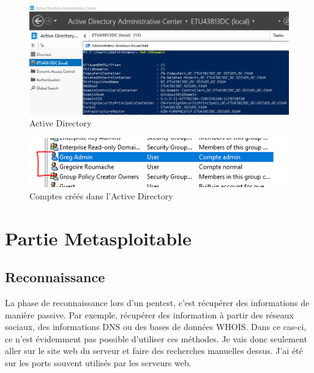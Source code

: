 \documentclass[a4paper]{article}
\begin{document}
\begin{figure}[H]
    \centering
    \includegraphics[width=0.90\linewidth]{images/active-directory.PNG}
    \caption{Active Directory}
    \label{fig:AD}
\end{figure}
\begin{figure}[H]
    \centering
    \includegraphics[width=0.6\linewidth]{images/comptes-active-directory.PNG}
    \caption{Comptes créés dans l'Active Directory}
    \label{fig:comptesAD}
\end{figure}















\newpage \section{Partie Metasploitable}










\subsection{Reconnaissance}





La phase de reconnaissance lors d'un pentest, c'est récupérer des informations de manière passive. Par exemple, récupérer des information à partir des réseaux sociaux, des informations DNS ou des bases de données WHOIS. Dans ce cas-ci, ce n'est évidemment pas possible d'utiliser ces méthodes. Je vais donc seulement aller sur le site web du serveur et faire des recherches manuelles dessus. J'ai été sur les ports souvent utilisés par les serveurs web.
\end{document}
